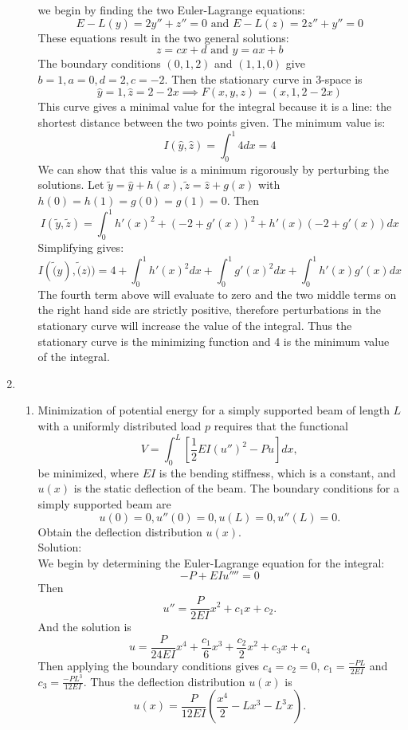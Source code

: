\documentclass[12pt]{article}
\numberwithin{equation}{section}
\begin{document}
\begin{enumerate}
\begin{enumerate}
    we begin by finding the two Euler-Lagrange equations:
    $$E-L(y)=2y''+z''=0\text{ and }E-L(z)=2z''+y''=0$$
    These equations result in the two general solutions:
    $$z=cx+d\text{ and }y=ax+b$$
    The boundary conditions $(0,1,2)$ and $(1,1,0)$ give $b=1,a=0,d=2,c=-2$. Then the stationary curve in 3-space is
    $$\hat{y}=1, \hat{z}=2-2x\implies F(x,y,z)=(x,1,2-2x)$$
    This curve gives a minimal value for the integral because it is a line: the shortest distance between the two points given. The minimum value is:
    $$I(\hat{y},\hat{z})=\int_0^1 4 dx=4$$
    We can show that this value is a minimum rigorously by perturbing the solutions. Let $\tilde{y}=\hat{y}+h(x),\tilde{z}=\hat{z}+g(x)$ with $h(0)=h(1)=g(0)=g(1)=0$. Then
    $$I(\tilde{y},\tilde{z})=\int_0^1 h'(x)^2+(-2+g'(x))^2+h'(x)(-2+g'(x))dx$$
    Simplifying gives:
    $$I(\tilde(y),\tilde(z))=4+\int_0^1 h'(x)^2dx+\int_0^1 g'(x)^2dx+\int_0^1 h'(x)g'(x)dx$$
    The fourth term above will evaluate to zero and the two middle terms on the right hand side are strictly positive, therefore perturbations in the stationary curve will increase the value of the integral. Thus the stationary curve is the minimizing function and 4 is the minimum value of the integral.

    \end{enumerate}

\item \begin{enumerate} \item Minimization of potential energy for a simply supported beam of length $L$ with a uniformly distributed load $p$ requires that the functional
$$V=\int_0^L\left[\frac{1}{2}EI(u'')^2-Pu\right]dx,$$
be minimized, where $EI$ is the bending stiffness, which is a constant, and $u(x)$ is the static deflection of the beam. The boundary conditions for a simply supported beam are
$$u(0)=0,u''(0)=0,u(L)=0,u''(L)=0.$$
Obtain the deflection distribution $u(x).$\\

Solution:\\

We begin by determining the Euler-Lagrange equation for the integral:
$$-P+EIu''''=0$$
Then
$$u''=\frac{P}{2EI}x^2+c_1x+c_2.$$
And the solution is
$$u=\frac{P}{24EI}x^4+\frac{c_1}{6}x^3+\frac{c_2}{2}x^2+c_3x+c_4$$
Then applying the boundary conditions gives $c_4=c_2=0$, $c_1=\frac{-PL}{2EI}$ and $c_3=\frac{-PL^3}{12EI}$. Thus the deflection distribution $u(x)$ is
$$u(x)=\frac{P}{12EI}(\frac{x^4}{2}-Lx^3-L^3x).$$


\end{enumerate}
\end{enumerate}
\end{document}
